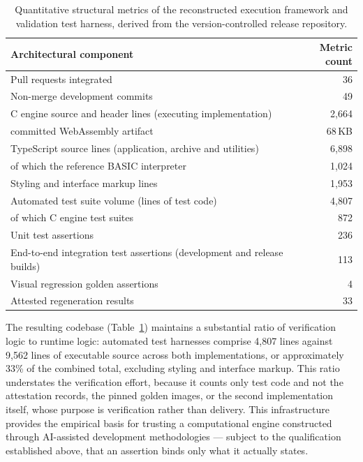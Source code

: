 \documentclass[11pt,a4paper]{article}
\begin{document}
\begin{table}[h]
\centering\small
\begin{tabularx}{\linewidth}{@{}Xr@{}}
\toprule
Architectural component & Metric count \\
\midrule
Pull requests integrated & 36 \\
Non-merge development commits & 49 \\
C engine source and header lines (executing implementation) & 2{,}664 \\
\quad committed WebAssembly artifact & 68\,KB \\
TypeScript source lines (application, archive and utilities) & 6{,}898 \\
\quad of which the reference BASIC interpreter & 1{,}024 \\
Styling and interface markup lines & 1{,}953 \\
Automated test suite volume (lines of test code) & 4{,}807 \\
\quad of which C engine test suites & 872 \\
Unit test assertions & 236 \\
End-to-end integration test assertions (development and release builds) & 113 \\
Visual regression golden assertions & 4 \\
Attested regeneration results & 33 \\
\bottomrule
\end{tabularx}
\caption{Quantitative structural metrics of the reconstructed execution framework and validation test harness, derived from the version-controlled release repository.}
\label{tab:llm}
\end{table}

The resulting codebase (Table~\ref{tab:llm}) maintains a substantial ratio of verification logic to runtime logic: automated test harnesses comprise 4{,}807 lines against 9{,}562 lines of executable source across both implementations, or approximately 33\% of the combined total, excluding styling and interface markup. This ratio understates the verification effort, because it counts only test code and not the attestation records, the pinned golden images, or the second implementation itself, whose purpose is verification rather than delivery. This infrastructure provides the empirical basis for trusting a computational engine constructed through AI-assisted development methodologies --- subject to the qualification established above, that an assertion binds only what it actually states.
\end{document}
